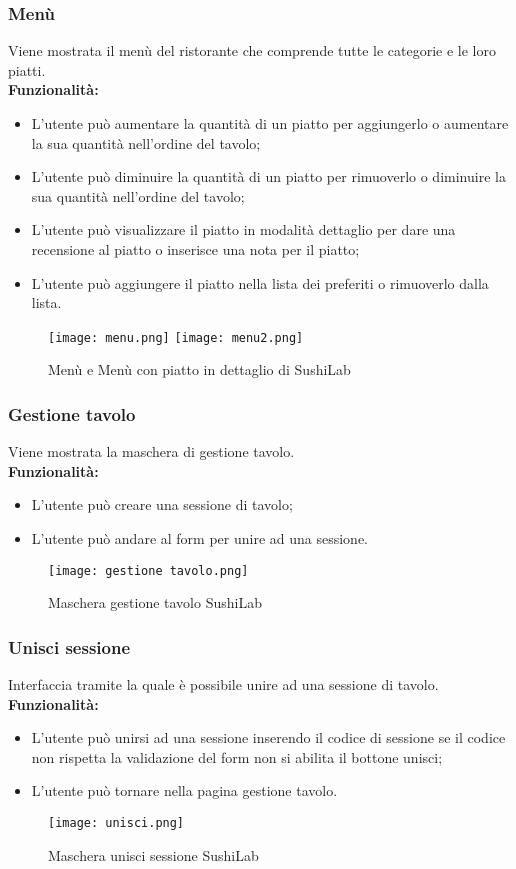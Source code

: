 \subsubsection{Menù}
Viene mostrata il menù del ristorante che comprende tutte le categorie e le loro piatti.\\
\textbf{Funzionalità:}
\begin{itemize}
    \item L'utente può aumentare la quantità di un piatto per aggiungerlo o aumentare la sua quantità nell'ordine del tavolo;
    \item L'utente può diminuire la quantità di un piatto per rimuoverlo o diminuire la sua quantità nell'ordine del tavolo;
    \item L'utente può visualizzare il piatto in modalità dettaglio per dare una recensione al piatto o inserisce una nota per il piatto;
    \item L'utente può aggiungere il piatto nella lista dei preferiti o rimuoverlo dalla lista.
\end{itemize}
\begin{figure}[H]
    \centering
    \texttt{[image: menu.png]}
    \texttt{[image: menu2.png]}
    \caption{Menù e Menù con piatto in dettaglio di SushiLab}
\end{figure}
\pagebreak

\subsubsection{Gestione tavolo}
Viene mostrata la maschera di gestione tavolo.\\
\textbf{Funzionalità:}
\begin{itemize}
    \item L'utente può creare una sessione di tavolo;
    \item L'utente può andare al form per unire ad una sessione.
\end{itemize}
\begin{figure}[H]
    \centering
    \texttt{[image: gestione tavolo.png]}
    \caption{Maschera gestione tavolo SushiLab}
\end{figure}
\pagebreak

\subsubsection{Unisci sessione}
Interfaccia tramite la quale è possibile unire ad una sessione di tavolo.\\
\textbf{Funzionalità:}
\begin{itemize}
    \item L'utente può  unirsi ad una sessione inserendo il codice di sessione se il codice non rispetta la validazione del form non si abilita il bottone unisci;
    \item L'utente può tornare nella pagina gestione tavolo.
\end{itemize}
\begin{figure}[H]
    \centering
    \texttt{[image: unisci.png]}
    \caption{Maschera unisci sessione SushiLab}
\end{figure}
\pagebreak

